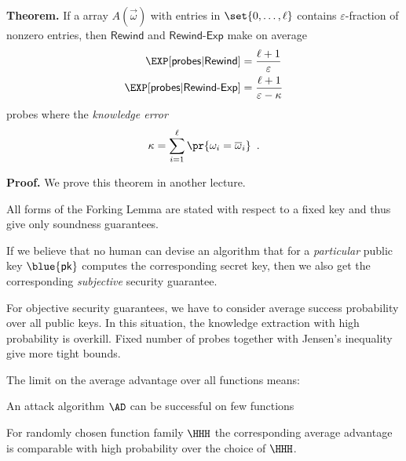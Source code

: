 \documentclass[landscape,footrule]{foils}
\renewcommand{\PK}{{\blue{\mathsf{pk}}}}
\newcommand{\probes}{\mathsf{probes}}
\begin{document}

\textbf{Theorem.}  If a array $A(\vec{\omega})$ with entries in
$\set{0,\ldots,\ell}$ contains $\varepsilon$-fraction of nonzero entries,
then $\mathsf{Rewind}$ and $\mathsf{Rewind\text{-}Exp}$ make on
average
\begin{align*}
  \EXP[\probes| \mathsf{Rewind}] &=\frac{\ell+1}{\varepsilon}\\
  \EXP[\probes|\mathsf{Rewind\text{-}Exp}] &=\frac{\ell+1}{\varepsilon-\kappa}
\end{align*}
probes where the \emph{knowledge error} 
\begin{align*}
 \kappa=\sum_{i=1}^\ell\pr{\omega_i=\overline{\omega}_i}\enspace.  
\end{align*}

\textbf{Proof.} We prove this theorem in another lecture.






All forms of the Forking Lemma are stated with respect to a fixed key
and thus give only soundness guarantees.\vspace*{0.5cm}

If we believe that no human can devise an algorithm that for a
\emph{particular} public key $\PK$ computes the corresponding secret
key, then we also get the corresponding \emph{subjective} security
guarantee.\vspace*{0.5cm}

For objective security guarantees, we have to consider average success
probability over all public keys. In this situation, the knowledge
extraction with high probability is overkill.  Fixed number of probes
together with Jensen's inequality give more tight bounds.\vspace*{0.5cm}







The limit on the average advantage over all functions means:
\begin{triangles}
  \item An attack algorithm $\AD$ can be successful on few functions
  \item For randomly chosen function family $\HHH$ the corresponding
    average advantage is comparable with high probability over
    the choice of $\HHH$.
\end{triangles}
\end{document}
